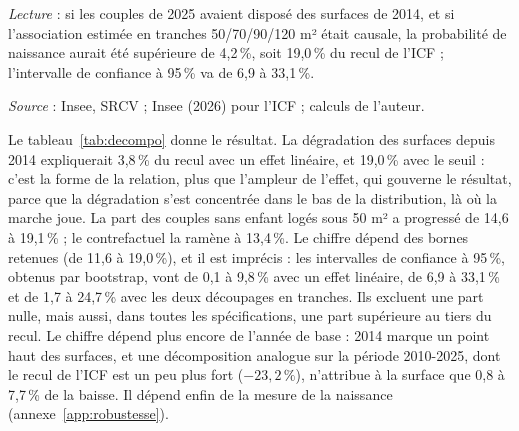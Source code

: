 \documentclass[11pt,a4paper]{article}
\theoremstyle{plain}
\theoremstyle{definition}
\theoremstyle{remark}
\begin{document}
\begin{table}[htbp]
\begin{threeparttable}
\begin{tablenotes}
\item \textit{Lecture} : si les couples de 2025 avaient disposé des surfaces de 2014, et si l'association estimée en tranches 50/70/90/120 m² était causale, la probabilité de naissance aurait été supérieure de 4,2\,\%, soit 19,0\,\% du recul de l'ICF ; l'intervalle de confiance à 95\,\% va de 6,9 à 33,1\,\%.
\item \textit{Source} : Insee, SRCV ; Insee (2026) pour l'ICF ; calculs de l'auteur.
\end{tablenotes}
\end{threeparttable}
\end{table}

Le tableau~\ref{tab:decompo} donne le résultat. La dégradation des surfaces depuis 2014 expliquerait 3,8\,\% du recul avec un effet linéaire, et 19,0\,\% avec le seuil : c'est la forme de la relation, plus que l'ampleur de l'effet, qui gouverne le résultat, parce que la dégradation s'est concentrée dans le bas de la distribution, là où la marche joue. La part des couples sans enfant logés sous 50 m² a progressé de 14,6 à 19,1\,\% ; le contrefactuel la ramène à 13,4\,\%. Le chiffre dépend des bornes retenues (de 11,6 à 19,0\,\%), et il est imprécis : les intervalles de confiance à 95\,\%, obtenus par bootstrap, vont de 0,1 à 9,8\,\% avec un effet linéaire, de 6,9 à 33,1\,\% et de 1,7 à 24,7\,\% avec les deux découpages en tranches. Ils excluent une part nulle, mais aussi, dans toutes les spécifications, une part supérieure au tiers du recul. Le chiffre dépend plus encore de l'année de base : 2014 marque un point haut des surfaces, et une décomposition analogue sur la période 2010-2025, dont le recul de l'ICF est un peu plus fort ($-23{,}2\,\%$), n'attribue à la surface que 0,8 à 7,7\,\% de la baisse. Il dépend enfin de la mesure de la naissance (annexe~\ref{app:robustesse}).
\end{document}
